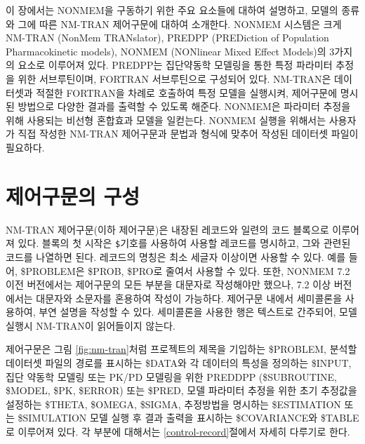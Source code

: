 \documentclass[
  11pt,
  krantz2,
  a4paper]{krantz}
\theoremstyle{definition}
\theoremstyle{definition}
\theoremstyle{definition}
\theoremstyle{remark}
\begin{document}
이 장에서는 NONMEM을 구동하기 위한 주요 요소들에 대하여 설명하고, 모델의 종류와 그에 따른 NM-TRAN 제어구문에 대하여 소개한다. NONMEM 시스템은 크게 NM-TRAN (NonMem TRANslator), PREDPP (PREDiction of Population Pharmacokinetic models), NONMEM (NONlinear Mixed Effect Models)의 3가지의 요소로 이루어져 있다. PREDPP는 집단약동학 모델링을 통한 특정 파라미터 추정을 위한 서브루틴이며, FORTRAN 서브루틴으로 구성되어 있다. NM-TRAN은 데이터셋과 적절한 FORTRAN을 차례로 호출하여 특정 모델을 실행시켜, 제어구문에 명시된 방법으로 다양한 결과를 출력할 수 있도록 해준다. NONMEM은 파라미터 추정을 위해 사용되는 비선형 혼합효과 모델을 일컫는다. NONMEM 실행을 위해서는 사용자가 직접 작성한 NM-TRAN 제어구문과 문법과 형식에 맞추어 작성된 데이터셋 파일이 필요하다.

\hypertarget{uxc81cuxc5b4uxad6cuxbb38uxc758-uxad6cuxc131}{%
\section{제어구문의 구성}\label{uxc81cuxc5b4uxad6cuxbb38uxc758-uxad6cuxc131}}

NM-TRAN 제어구문(이하 제어구문)은 내장된 레코드와 일련의 코드 블록으로 이루어져 있다. 블록의 첫 시작은 \texttt{\$}기호를 사용하여 사용할 레코드를 명시하고, 그와 관련된 코드를 나열하면 된다. 레코드의 명칭은 최소 세글자 이상이면 사용할 수 있다. 예를 들어, \$PROBLEM은 \$PROB, \$PRO로 줄여서 사용할 수 있다. 또한, NONMEM 7.2 이전 버전에서는 제어구문의 모든 부분을 대문자로 작성해야만 했으나, 7.2 이상 버전에서는 대문자와 소문자를 혼용하여 작성이 가능하다. 제어구문 내에서 세미콜론을 사용하여, 부연 설명을 작성할 수 있다. 세미콜론을 사용한 행은 텍스트로 간주되어, 모델 실행시 NM-TRAN이 읽어들이지 않는다.

제어구문은 그림 \ref{fig:nm-tran}처럼 프로젝트의 제목을 기입하는 \$PROBLEM, 분석할 데이터셋 파일의 경로를 표시하는 \$DATA와 각 데이터의 특성을 정의하는 \$INPUT, 집단 약동학 모델링 또는 PK/PD 모델링을 위한 PREDDPP (\$SUBROUTINE, \$MODEL, \$PK, \$ERROR) 또는 \$PRED, 모델 파라미터 추정을 위한 초기 추정값을 설정하는 \$THETA, \$OMEGA, \$SIGMA, 추정방법을 명시하는 \$ESTIMATION 또는 \$SIMULATION 모델 실행 후 결과 출력을 표시하는 \$COVARIANCE와 \$TABLE로 이루어져 있다. 각 부분에 대해서는 \ref{control-record}절에서 자세히 다루기로 한다.
\end{document}
